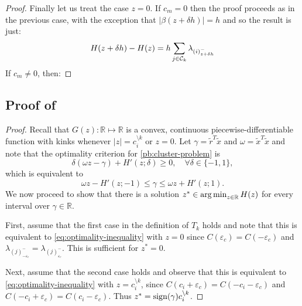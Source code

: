 \begin{proof}
  Finally let us treat the case $z = 0$.
  If $c_m = 0$ then the proof proceeds as in the previous case, with the exception that $|\beta(z + \delta h)| = h$ and so the result is just:
  \begin{align}
    H(z + \delta h) - H(z)
      &= h \sum_{j \in \mathcal{C}_k} \lambda_{(i)^-_{z + \delta h}} \nonumber \\
  \end{align}
  If $c_m \neq 0$, then:
\end{proof}

\subsection{Proof of }

\begin{proof}
  Recall that \(G(z) : \mathbb{R} \mapsto \mathbb{R}\) is a convex,
  continuous piecewise-differentiable function with kinks whenever \(|z| =
  c_i^{\setminus k}\) or \(z = 0\). Let \(\gamma = \tilde{r}^T\tilde{x}\)
  and \(\omega = \tilde{x}^T\tilde{x}\) and note that the optimality criterion for
  \eqref{pb:cluster-problem} is
  \[
    \delta(\omega z - \gamma) + H'(z; \delta) \geq 0, \quad
    \forall \delta \in \{-1, 1\},
  \]
  which is equivalent to
  \begin{equation}
    \label{eq:optimality-inequality}
    \omega z - H'(z; -1) \leq \gamma \leq \omega z + H'(z; 1).
  \end{equation}
  We now proceed to show that there is a solution \(z^* \in \operatorname*{arg\,min}_{z \in
    \mathbb{R}} H(z)\) for every interval over \(\gamma \in \mathbb{R}\).

  First, assume that the first case in the definition of \(T_k\) holds
  and note that this is equivalent to \eqref{eq:optimality-inequality} with \(z
  = 0\) since \(C({\varepsilon_c}) = C(-{\varepsilon_c})\) and
  \(\lambda_{(j)^-_{-{\varepsilon_c}}} = \lambda_{(j)^-_{{\varepsilon_c}}}\).
  This is sufficient for \(z^* = 0\).

  Next, assume that the second case holds and observe that this is equivalent
  to \eqref{eq:optimality-inequality} with
  \(z = c_i^{\setminus k}\), since
  \(C(c_i + {\varepsilon_c}) = C(-c_i - {\varepsilon_c})\) and
  \(C(-c_i + {\varepsilon_c}) = C(c_i - {\varepsilon_c})\). Thus \(z^* =
  \operatorname{sign}(\gamma)c_i^{\setminus k}\).


\end{proof}
